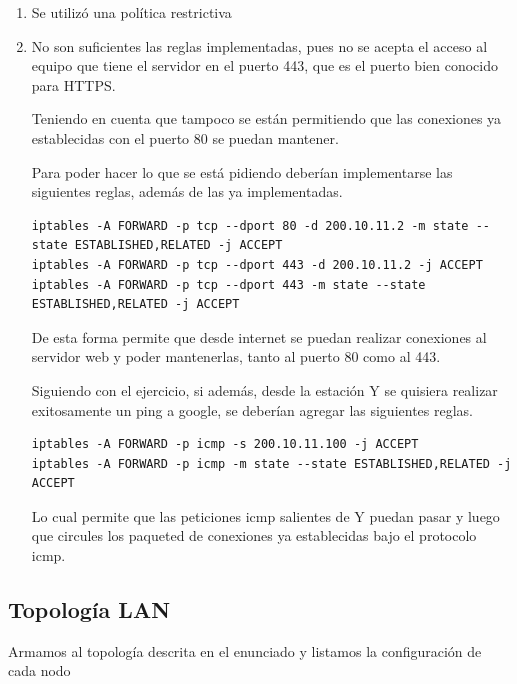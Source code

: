 \begin{enumerate}
    \item Se utilizó una política restrictiva
    \item No son suficientes las reglas implementadas, pues no se acepta el acceso al equipo que tiene el servidor en el puerto 443, que es el puerto bien conocido para HTTPS.

        Teniendo en cuenta que tampoco se están permitiendo que las conexiones ya establecidas con el puerto 80 se puedan mantener.

        Para poder hacer lo que se está pidiendo deberían implementarse las siguientes reglas, además de las ya implementadas.

\begin{lstlisting}[breaklines=true]
iptables -A FORWARD -p tcp --dport 80 -d 200.10.11.2 -m state --state ESTABLISHED,RELATED -j ACCEPT
iptables -A FORWARD -p tcp --dport 443 -d 200.10.11.2 -j ACCEPT
iptables -A FORWARD -p tcp --dport 443 -m state --state ESTABLISHED,RELATED -j ACCEPT
\end{lstlisting}

De esta forma permite que desde internet se puedan realizar conexiones al servidor web y poder mantenerlas, tanto al puerto 80 como al 443.

Siguiendo con el ejercicio, si además, desde la estación Y se quisiera realizar exitosamente un ping a google, se deberían agregar las siguientes reglas.

\begin{lstlisting}[breaklines=true]
iptables -A FORWARD -p icmp -s 200.10.11.100 -j ACCEPT
iptables -A FORWARD -p icmp -m state --state ESTABLISHED,RELATED -j ACCEPT
\end{lstlisting}

Lo cual permite que las peticiones icmp salientes de Y puedan pasar y luego que circules los paqueted de conexiones ya establecidas bajo el protocolo icmp.
\end{enumerate}

\subsection*{Topología LAN}


Armamos al topología descrita en el enunciado y listamos la configuración de cada nodo

